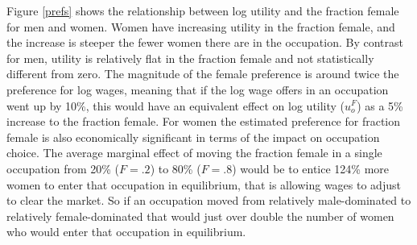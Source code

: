 \documentclass[12pt]{article}
\begin{document}







Figure \ref{prefs} shows the relationship between log utility and the fraction female for men and women. Women have increasing utility in the fraction female, and the increase is steeper the fewer women there are in the occupation. By contrast for men, utility is relatively flat in the fraction female and not statistically different from zero. The magnitude of the female preference is around twice the preference for log wages, meaning that if the log wage offers in an occupation went up by 10\%, this would have an equivalent effect on log utility ($u^F_o$) as a 5\% increase to the fraction female. For women the estimated preference for fraction female is also economically significant in terms of the impact on occupation choice. The average marginal effect of moving the fraction female in a single occupation from 20\% ($F=.2$) to 80\% ($F=.8$) would be to entice 124\% more women to enter that occupation in equilibrium, that is allowing wages to adjust to clear the market. So if an occupation moved from relatively male-dominated to relatively female-dominated that would just over double the number of women who would enter that occupation in equilibrium.

\end{document}
